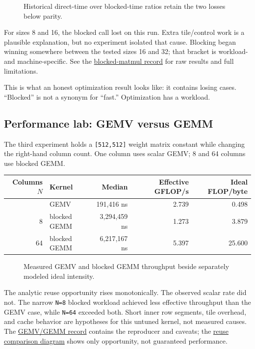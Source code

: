 \documentclass[
  10pt,
]{article}
\newcounter{none} %
\begin{document}
\begin{figure}[H]\centering\resizebox{\linewidth}{!}{}\caption{Historical direct-time over blocked-time ratios retain the two losses below parity.}\end{figure}

For sizes 8 and 16, the blocked call lost on this run. Extra
tile/control work is a plausible explanation, but no experiment isolated
that cause. Blocking began winning somewhere between the tested sizes 16
and 32; that bracket is workload- and machine-specific. See the
\href{https://github.com/hermonai/inside-the-llm-engine/blob/astra-visual-rewrite/research/benchmarks/chapter-06-blocked-matmul.md}{blocked-matmul
record} for raw results and full limitations.

This is what an honest optimization result looks like: it contains
losing cases. ``Blocked'' is not a synonym for ``fast.'' Optimization
has a workload.

\subsection{Performance lab: GEMV versus
GEMM}\label{performance-lab-gemv-versus-gemm}

The third experiment holds a \texttt{{[}512,512{]}} weight matrix
constant while changing the right-hand column count. One column uses
scalar GEMV; 8 and 64 columns use blocked GEMM.

{\def\LTcaptype{none} %
\begin{longtable}[]{@{}rlrrr@{}}
\toprule\noalign{}
Columns \(N\) & Kernel & Median & Effective GFLOP/s & Ideal FLOP/byte \\
\midrule\noalign{}
\endhead
\bottomrule\noalign{}
\endlastfoot
1 & GEMV & 191,416 ns & 2.739 & 0.498 \\
8 & blocked GEMM & 3,294,459 ns & 1.273 & 3.879 \\
64 & blocked GEMM & 6,217,167 ns & 5.397 & 25.600 \\
\end{longtable}
}

\begin{figure}[H]\centering\resizebox{\linewidth}{!}{}\caption{Measured GEMV and blocked GEMM throughput beside separately modeled ideal intensity.}\end{figure}

The analytic reuse opportunity rises monotonically. The observed scalar
rate did not. The narrow \texttt{N=8} blocked workload achieved less
effective throughput than the GEMV case, while \texttt{N=64} exceeded
both. Short inner row segments, tile overhead, and cache behavior are
hypotheses for this untuned kernel, not measured causes. The
\href{https://github.com/hermonai/inside-the-llm-engine/blob/astra-visual-rewrite/research/benchmarks/chapter-06-gemv-vs-gemm.md}{GEMV/GEMM
record} contains the reproducer and caveats; the
\href{https://github.com/hermonai/inside-the-llm-engine/blob/astra-visual-rewrite/diagrams/linear/gemv-vs-gemm-reuse.txt}{reuse
comparison diagram} shows only opportunity, not guaranteed performance.
\end{document}
